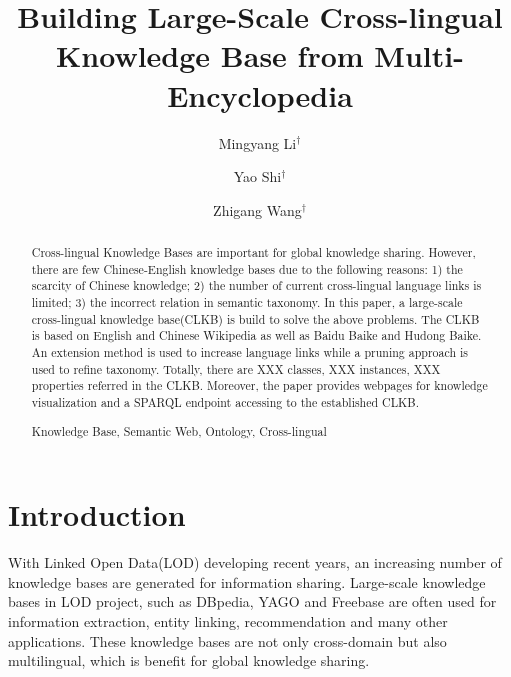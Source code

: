 \documentclass[runningheads,a4paper]{llncs}
\newcommand{\keywords}[1]{\par\addvspace\baselineskip\noindent\keywordname\enspace\ignorespaces#1}
\begin{document}
\mainmatter

\title{Building Large-Scale Cross-lingual Knowledge Base from Multi-Encyclopedia}
\author{Mingyang Li$^\dag$ \and Yao Shi$^\dag$ \and Zhigang Wang$^\dag$}


\maketitle

\begin{abstract}

Cross-lingual Knowledge Bases are important for global knowledge sharing. However, there are few Chinese-English knowledge bases due to the following reasons: 1) the scarcity of Chinese knowledge; 2) the number of current cross-lingual language links is limited; 3) the incorrect relation in semantic taxonomy. In this paper, a large-scale cross-lingual knowledge base(CLKB) is build to solve the above problems. The CLKB is based on English and Chinese Wikipedia as well as Baidu Baike and Hudong Baike. An extension method is used to increase language links while a pruning approach is used to refine taxonomy. Totally, there are XXX classes, XXX instances, XXX properties referred in the CLKB. Moreover, the paper provides webpages for knowledge visualization and a SPARQL endpoint accessing to the established CLKB.

\keywords{Knowledge Base, Semantic Web, Ontology, Cross-lingual}
\end{abstract}

\section{Introduction}
With Linked Open Data(LOD) developing recent years, an increasing number of knowledge bases are generated for information sharing. Large-scale knowledge bases in LOD project, such as DBpedia\cite{mendes2012dbpedia}, YAGO\cite{mahdisoltani2014yago3} and Freebase\cite{bollacker2008freebase} are often used for information extraction\cite{dutta2013integrating}, entity linking\cite{shen2012linden}, recommendation\cite{fernandez2011generic,kaminskas2012knowledge} and many other applications. These knowledge bases are not only cross-domain but also multilingual, which is benefit for global knowledge sharing.
\end{document}

